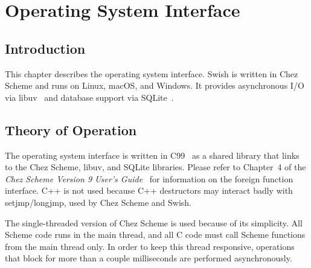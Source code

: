 %
%
%

\chapter {Operating System Interface}\label{chap:osi}

\section {Introduction}

This chapter describes the operating system interface. Swish is
written in Chez Scheme and runs on Linux, macOS, and Windows. It
provides asynchronous I/O via libuv~\cite{libuv} and database support
via SQLite~\cite{sqlite-guide}.

\section {Theory of Operation}

The operating system interface is written in C99~\cite{c99} as a
shared library that links to the Chez Scheme, libuv, and SQLite
libraries. Please refer to Chapter~4 of the \emph{Chez Scheme Version
  9 User's Guide}~\cite{chez-scheme-users-guide} for information on
the foreign function interface. C++ is not used because C++
destructors may interact badly with setjmp/longjmp, used by Chez
Scheme and Swish.

The single-threaded version of Chez Scheme is used because of its
simplicity. All Scheme code runs in the main thread, and all C code
must call Scheme functions from the main thread only. In order to keep
this thread responsive, operations that block for more than a couple
milliseconds are performed asynchronously.

